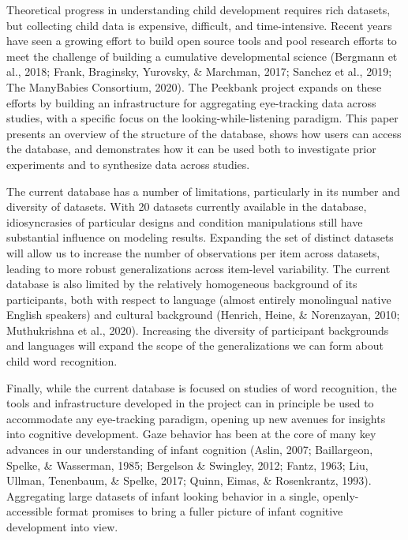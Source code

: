 \documentclass[
  english,
  man,floatsintext]{apa6}
\begin{document}
Theoretical progress in understanding child development requires rich datasets, but collecting child data is expensive, difficult, and time-intensive.
Recent years have seen a growing effort to build open source tools and pool research efforts to meet the challenge of building a cumulative developmental science (Bergmann et al., 2018; Frank, Braginsky, Yurovsky, \& Marchman, 2017; Sanchez et al., 2019; The ManyBabies Consortium, 2020).
The Peekbank project expands on these efforts by building an infrastructure for aggregating eye-tracking data across studies, with a specific focus on the looking-while-listening paradigm.
This paper presents an overview of the structure of the database, shows how users can access the database, and demonstrates how it can be used both to investigate prior experiments and to synthesize data across studies.

The current database has a number of limitations, particularly in its number and diversity of datasets.
With 20 datasets currently available in the database, idiosyncrasies of particular designs and condition manipulations still have substantial influence on modeling results.
Expanding the set of distinct datasets will allow us to increase the number of observations per item across datasets, leading to more robust generalizations across item-level variability.
The current database is also limited by the relatively homogeneous background of its participants, both with respect to language (almost entirely monolingual native English speakers) and cultural background (Henrich, Heine, \& Norenzayan, 2010; Muthukrishna et al., 2020).
Increasing the diversity of participant backgrounds and languages will expand the scope of the generalizations we can form about child word recognition.

Finally, while the current database is focused on studies of word recognition, the tools and infrastructure developed in the project can in principle be used to accommodate any eye-tracking paradigm, opening up new avenues for insights into cognitive development.
Gaze behavior has been at the core of many key advances in our understanding of infant cognition (Aslin, 2007; Baillargeon, Spelke, \& Wasserman, 1985; Bergelson \& Swingley, 2012; Fantz, 1963; Liu, Ullman, Tenenbaum, \& Spelke, 2017; Quinn, Eimas, \& Rosenkrantz, 1993).
Aggregating large datasets of infant looking behavior in a single, openly-accessible format promises to bring a fuller picture of infant cognitive development into view.

\newpage
\end{document}
